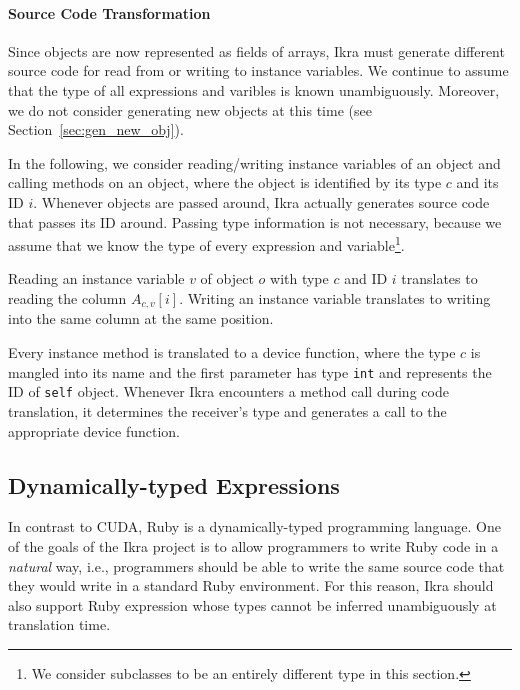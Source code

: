 \documentclass[preprint]{sigplanconf}
\begin{document}
\paragraph{Source Code Transformation}
Since objects are now represented as fields of arrays, Ikra must generate different source code for read from or writing to instance variables. We continue to assume that the type of all expressions and varibles is known unambiguously. Moreover, we do not consider generating new objects at this time (see Section~\ref{sec:gen_new_obj}).

In the following, we consider reading/writing instance variables of an object and calling methods on an object, where the object is identified by its type $c$ and its ID $i$. Whenever objects are passed around, Ikra actually generates source code that passes its ID around. Passing type information is not necessary, because we assume that we know the type of every expression and variable\footnote{We consider subclasses to be an entirely different type in this section.}.

Reading an instance variable $v$ of object $o$ with type $c$ and ID $i$ translates to reading the column $A_{c,v}[i]$. Writing an instance variable translates to writing into the same column at the same position.

Every instance method is translated to a device function, where the type $c$ is mangled into its name and the first parameter has type \texttt{int} and represents the ID of \texttt{self} object. Whenever Ikra encounters a method call during code translation, it determines the receiver's type and generates a call to the appropriate device function.



\subsection{Dynamically-typed Expressions}
\label{sec:polymorphic}
In contrast to CUDA, Ruby is a dynamically-typed programming language. One of the goals of the Ikra project is to allow programmers to write Ruby code in a \emph{natural} way, i.e., programmers should be able to write the same source code that they would write in a standard Ruby environment. For this reason, Ikra should also support Ruby expression whose types cannot be inferred unambiguously at translation time.
\end{document}
